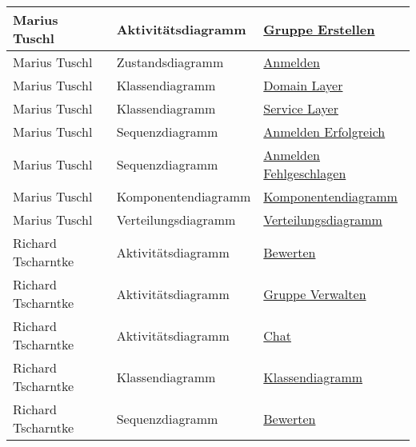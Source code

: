 \begin{tabularx}{\linewidth}{|X|X|X|}
		\hline
		Marius Tuschl&Aktivitätsdiagramm&\hyperref[fig:ActDia_Gruppe_Erstellen]{Gruppe Erstellen}\\
		\hline
		Marius Tuschl&Zustandsdiagramm&\hyperref[fig:STM_Anmelden]{Anmelden}\\
		\hline
		Marius Tuschl&Klassendiagramm&\hyperref[fig:ClassDia_Domain_Layer]{Domain Layer}\\
		\hline
		Marius Tuschl&Klassendiagramm&\hyperref[fig:ClassDia_Service_Layer]{Service Layer}\\
		\hline
		Marius Tuschl&Sequenzdiagramm&\hyperref[fig:SeqDia_Anmelden_Erfolgreich]{Anmelden Erfolgreich}\\
		\hline
		Marius Tuschl&Sequenzdiagramm&\hyperref[fig:SeqDia_Anmelden_Fehlgeschlagen]{Anmelden Fehlgeschlagen}\\
		\hline
		Marius Tuschl&Komponentendiagramm&\hyperref[fig:CompDia]{Komponentendiagramm}\\
		\hline
		Marius Tuschl&Verteilungsdiagramm&\hyperref[fig:VerteilungsDia]{Verteilungsdiagramm}\\
		\hline
		\hline
		Richard Tscharntke&Aktivitätsdiagramm&\hyperref[fig:ActDia_Bewerten]{Bewerten}\\
		\hline
		Richard Tscharntke&Aktivitätsdiagramm&\hyperref[fig:ActDia_Gruppe_Verwalten]{Gruppe Verwalten}\\
		\hline
		Richard Tscharntke&Aktivitätsdiagramm&\hyperref[fig:ActDia_Chat]{Chat}\\
		\hline
		Richard Tscharntke&Klassendiagramm&\hyperref[fig:ClassDia_Richard]{Klassendiagramm}\\
		\hline
		Richard Tscharntke&Sequenzdiagramm&\hyperref[fig:SeqDia_Bewerten]{Bewerten}\\
		\hline
		
	\end{tabularx}